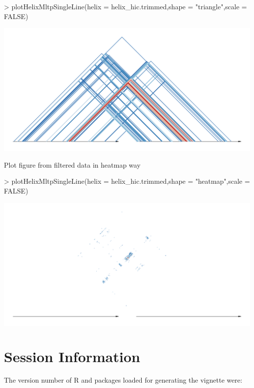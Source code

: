 \documentclass[letterpaper]{article}
\begin{document}
\begin{Schunk}
\begin{Sinput}
> plotHelixMltpSingleLine(helix = helix_hic.trimmed,shape = "triangle",scale = FALSE)
\end{Sinput}
\end{Schunk}
\includegraphics{R4RNA-035}

Plot figure from filtered data in heatmap way

\begin{Schunk}
\begin{Sinput}
> plotHelixMltpSingleLine(helix = helix_hic.trimmed,shape = "heatmap",scale = FALSE)
\end{Sinput}
\end{Schunk}
\includegraphics{R4RNA-036}

\section{Session Information}

The version number of R and packages loaded for generating the vignette were:
\end{document}
